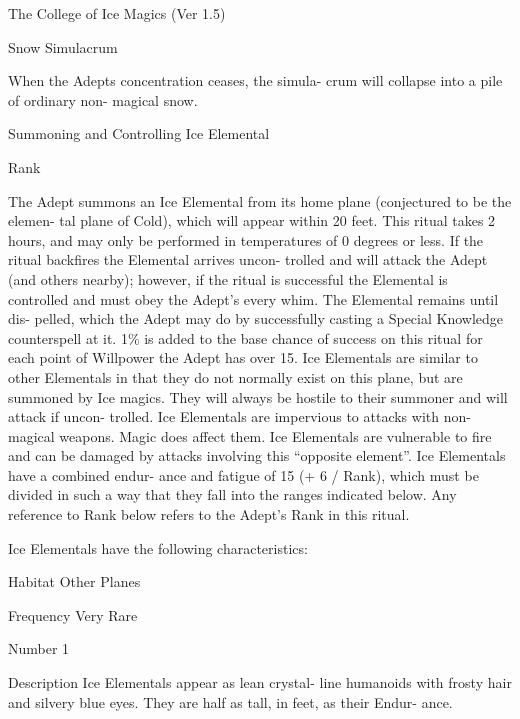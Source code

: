 \begin{Chapter}{The College of Ice Magics (Ver 1.5)}
\begin{ritual}[R-1]{Snow Simulacrum }
\begin{effects}
When the Adepts concentration ceases, the simula-
crum  will  collapse  into  a  pile  of  ordinary  non-
magical snow. 


\end{effects}
\end{ritual}

\begin{ritual}[R-2]{Summoning and Controlling Ice Elemental }

Rank 
\begin{effects}
 The  Adept  summons  an  Ice  Elemental 
from its home plane (conjectured to be the elemen-
tal  plane  of  Cold),  which  will  appear  within  20 
feet.  This  ritual  takes  2  hours,  and  may  only  be 
performed  in  temperatures  of  0  degrees  or  less.  If 
the  ritual  backfires  the  Elemental  arrives  uncon-
trolled  and  will  attack  the  Adept  (and  others 
nearby);  however,  if  the  ritual  is  successful  the 
Elemental is controlled and must obey the Adept’s 
every  whim.  The  Elemental  remains  until  dis-
pelled,  which  the  Adept  may  do  by  successfully 
casting a Special Knowledge counterspell at it. 1\% 
is added to the base chance of success on this ritual 
for each point of Willpower the Adept has over 15. 
Ice  Elementals  are  similar  to  other  Elementals  in 
that  they  do  not  normally  exist  on  this  plane,  but 
are summoned by Ice magics. They will always be 
hostile to their summoner and will attack if uncon-
trolled.  Ice  Elementals  are  impervious  to  attacks 
with  non-magical  weapons.  Magic  does  affect 
them. Ice Elementals are vulnerable to fire and can 
be  damaged  by  attacks  involving  this  “opposite 
element”.  Ice  Elementals  have  a  combined  endur-
ance and fatigue of 15 (+ 6 / Rank), which must be 
divided in such a way that they fall into the ranges 
indicated  below.  Any  reference  to  Rank  below 
refers to the Adept’s Rank in this ritual. 

Ice Elementals have the following characteristics: 

Habitat Other Planes  

Frequency Very Rare  

Number 1 

Description Ice Elementals appear as lean crystal-
line  humanoids  with  frosty  hair  and  silvery  blue 
eyes.  They  are  half  as  tall,  in  feet,  as  their  Endur-
ance. 


\end{effects}
\end{ritual}
\end{Chapter}
